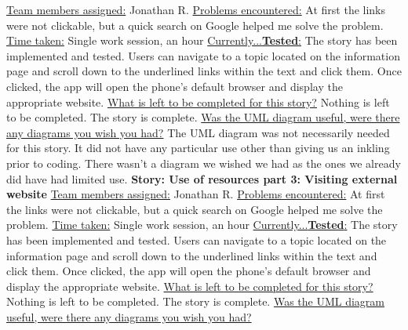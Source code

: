 \documentclass[letterpaper,12pt,titlepage]{article}
\begin{document}
\newline
\newline
\underline{Team members assigned:}
Jonathan R.
\newline
\underline{Problems encountered:}
At first the links were not clickable, but a quick search on Google\cite{google} helped me solve the problem.
\newline
\underline{Time taken:}
Single work session, an hour
\newline
\underline{Currently...\textbf{Tested}:}
The story has been implemented and tested. Users can navigate to a topic located on the information page and scroll down to the underlined links within the text and click them. Once clicked, the app will open the phone’s default browser and display the appropriate website.
\newline
\underline{What is left to be completed for this story?}
Nothing is left to be completed. The story is complete.
\newline
\underline{Was the UML diagram useful, were there any diagrams you wish you had?}
The UML diagram was not necessarily needed for this story. It did not have any particular use other than giving us an inkling prior to coding. There wasn’t a diagram we wished we had as the ones we already did have had limited use.
\newline
\newline
\noindent
\textbf{Story: Use of resources part 3: Visiting external website}
\newline
\newline
\underline{Team members assigned:}
Jonathan R.
\newline
\underline{Problems encountered:}
At first the links were not clickable, but a quick search on Google\cite{google} helped me solve the problem.
\newline
\underline{Time taken:}
Single work session, an hour
\newline
\underline{Currently...\textbf{Tested}:}
The story has been implemented and tested. Users can navigate to a topic located on the information page and scroll down to the underlined links within the text and click them. Once clicked, the app will open the phone’s default browser and display the appropriate website.
\newline
\underline{What is left to be completed for this story?}
Nothing is left to be completed. The story is complete.
\newline
\underline{Was the UML diagram useful, were there any diagrams you wish you had?}
\end{document}
